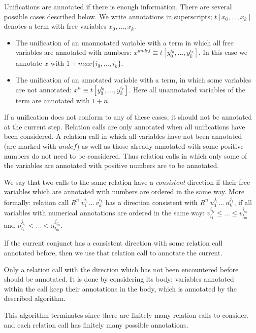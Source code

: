 \documentclass[submission,copyright,creativecommons]{eptcs}
\begin{document}
Unifications are annotated if there is enough information.
There are several possible cases described below.
We write annotations in superscripts; $t[x_0, \dots, x_k]$ denotes a term with free variables $x_0, \dots, x_k$.
\begin{itemize}
  \item The unification of an unannotated variable with a term in which all free variables are annotated with numbers: $x^{undef} \equiv t[y_0^{i_0},\dots, y_k^{i_k}]$. In this case we annotate $x$ with $1+max\{i_0,\dots,i_k\}$.
  \item The unification of an annotated variable with a term, in which some variables are not annotated: $x^{n} \equiv t[y_0^{i_0},\dots, y_k^{i_k}]$. Here all unannotated variables of the term are annotated with $1+n$.
\end{itemize}

If a unification does not conform to any of these cases, it should not be annotated at the current step.
Relation calls are only annotated when all unifications have been considered.
A relation call in which all variables have not been annotated (are marked with $undef$) as well as those already annotated with some positive numbers do not need to be considered.
Thus relation calls in which only some of the variables are annotated with positive numbers are to be annotated.

We say that two calls to the same relation have a \emph{consistent} direction if their free variables which are annotated with numbers are ordered in the same way.
More formally: relation call $R^n \ v_1^{i_1} \dots \ v_k^{i_k}$ has a direction consistent with $R^n \ u_1^{j_1} \dots \ u_k^{j_k}$, if all variables with numerical annotations are ordered in the same way: $v_{l_1}^{i_{l_1}} \leq \dots \leq v_{l_m}^{i_{l_m}}$ and $u_{l_1}^{j_{l_1}} \leq \dots \leq u_{l_m}^{j_{l_m}}$.

If the current conjunct has a consistent direction with some relation call annotated before, then we use that relation call to annotate the current.

Only a relation call with the direction which has not been encountered before should be annotated.
It is done by considering its body: variables annotated within the call keep their annotations in the body, which is annotated by  the described algorithm.

This algorithm terminates since there are finitely many relation calls to consider, and each relation call has finitely many possible annotations.


\nocite{*}


\end{document}
